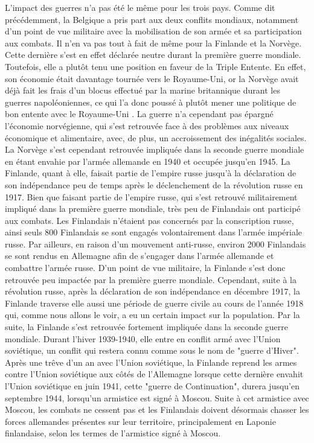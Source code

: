 \documentclass{article}
\begin{document}
L'impact des guerres n'a pas été le même pour les trois pays. Comme dit précédemment, la Belgique a pris part aux deux conflits mondiaux, notamment d'un point de vue militaire avec la mobilisation de son armée et sa participation aux combats. Il n'en va pas tout à fait de même pour la Finlande et la Norvège. Cette dernière s'est en effet déclarée neutre durant la première guerre mondiale\cite[p. 45]{knutsen1999norway}. Toutefois, elle a plutôt tenu une position en faveur de la Triple Entente. En effet, son économie était davantage tournée vers le Royaume-Uni, or la Norvège avait déjà fait les frais d'un blocus effectué par la marine britannique durant les guerres napoléoniennes, ce qui l'a donc poussé à plutôt mener une politique de bon entente avec le Royaume-Uni \cite[p. 46]{knutsen1999norway}. La guerre n'a cependant pas épargné l'économie norvégienne, qui s'est retrouvée face à des problèmes aux niveaux économique et alimentaire, avec, de plus, un accroissement des inégalités sociales\cite[pp. 48-49]{knutsen1999norway}. La Norvège s'est cependant retrouvée impliquée dans la seconde guerre mondiale en étant envahie par l'armée allemande en 1940 et occupée jusqu'en 1945. La Finlande, quant à elle, faisait partie de l'empire russe jusqu'à la déclaration de son indépendance peu de temps après le déclenchement de la révolution russe en 1917\cite{Maavara2016Revolution}. Bien que faisant partie de l'empire russe, qui s'est retrouvé militairement impliqué dans la première guerre mondiale, très peu de Finlandais ont participé aux combats. Les Finlandais n'étaient pas concernés par la conscription russe, ainsi seuls 800 Finlandais se sont engagés volontairement dans l'armée impériale russe. Par ailleurs, en raison d'un mouvement anti-russe, environ 2000 Finlandais se sont rendus en Allemagne afin de s'engager dans l'armée allemande et combattre l'armée russe. D'un point de vue militaire, la Finlande s'est donc retrouvée peu impactée par la première guerre mondiale\cite{Maavara2016FirstWorldWar}. Cependant, suite à la révolution russe, après la déclaration de son indépendance en décembre 1917, la Finlande traverse elle aussi une période de guerre civile au cours de l'année 1918 qui, comme nous allons le voir, a eu un certain impact sur la population\cite{Maavara2016CivilWar}. Par la suite, la Finlande s'est retrouvée fortement impliquée dans la seconde guerre mondiale. Durant l'hiver 1939-1940, elle entre en conflit armé avec l'Union soviétique, un conflit qui restera connu comme sous le nom de "guerre d'Hiver". Après une trêve d'un an avec l'Union soviétique, la Finlande reprend les armes contre l'Union soviétique aux côtés de l'Allemagne lorsque cette dernière envahit l'Union soviétique en juin 1941, cette "guerre de Continuation", durera jusqu'en septembre 1944, lorsqu'un armistice est signé à Moscou. Suite à cet armistice avec Moscou, les combats ne cessent pas et les Finlandais doivent désormais chasser les forces allemandes présentes sur leur territoire, principalement en Laponie finlandaise, selon les termes de l'armistice signé à Moscou\cite[pp. 5-17]{jowett2012finland}. 
\end{document}
